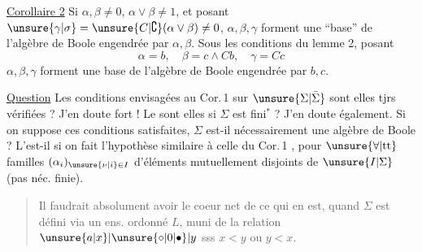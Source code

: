 
\uline{Corollaire 2}  Si $\alpha,\beta\ne0$, $\alpha\vee\beta\ne1$, et posant $\unsure{\gamma|\sigma}=\unsure{C|\complement}(\alpha\vee\beta)\ne0$, $\alpha,\beta,\gamma$ forment une ``base'' de l'algèbre de Boole engendrée par $\alpha,\beta$. Sous les conditions du lemme 2,  posant
\[
\alpha=b,\quad\beta=c\wedge Cb,\quad\gamma=Cc
\]
$\alpha,\beta,\gamma$ forment une base de l'algèbre de Boole engendrée par $b,c$.

\noindent\makebox[0pt][r]{\raisebox{-4\baselineskip}[0pt][0pt]{\rule{0.3pt}{5\baselineskip}\kern2pt\rule{0.3pt}{5\baselineskip}}\hspace{0.8em}}\uline{Question} Les conditions envisagées au  Cor.\,1 sur $\unsure{\Sigma|\bar\Sigma}$ sont elles tjrs vérifiées ? J'en doute fort ! Le sont elles si $\Sigma$ est fini${}^{*}$ ? J'en doute également.
Si on suppose ces conditions satisfaites, $\Sigma$ est-il nécessairement une algèbre de Boole ? L'est-il si on fait l'hypothèse similaire à celle du Cor.\,1 , pour \uline{$\unsure{\forall|\text{tt}}$} familles $(\alpha_i)_{\unsure{\nu|i}\in I}$ d'éléments mutuellement disjoints de $\unsure{I|\Sigma}$ (pas néc. finie).

\begin{quote}
\noindent\vrule\kern2pt\vrule\quad\begin{minipage}{0.86\linewidth}
Il faudrait absolument avoir le coeur net de ce qui en est, quand $\Sigma$ est défini via un ens. ordonné $L$, muni de la relation $\unsure{a|x}|\unsure{\circ|0|\bullet}|y$ sss $x<y$ ou $y<x$.
\end{minipage}
\end{quote}


